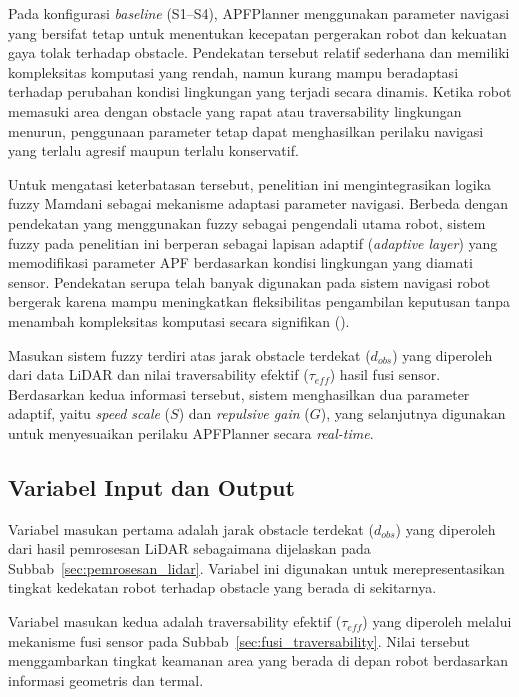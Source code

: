 Pada konfigurasi \textit{baseline} (S1--S4), APFPlanner menggunakan parameter navigasi yang bersifat tetap untuk menentukan kecepatan pergerakan robot dan kekuatan gaya tolak terhadap obstacle. Pendekatan tersebut relatif sederhana dan memiliki kompleksitas komputasi yang rendah, namun kurang mampu beradaptasi terhadap perubahan kondisi lingkungan yang terjadi secara dinamis. Ketika robot memasuki area dengan obstacle yang rapat atau traversability lingkungan menurun, penggunaan parameter tetap dapat menghasilkan perilaku navigasi yang terlalu agresif maupun terlalu konservatif.

Untuk mengatasi keterbatasan tersebut, penelitian ini mengintegrasikan logika fuzzy Mamdani sebagai mekanisme adaptasi parameter navigasi. Berbeda dengan pendekatan yang menggunakan fuzzy sebagai pengendali utama robot, sistem fuzzy pada penelitian ini berperan sebagai lapisan adaptif (\textit{adaptive layer}) yang memodifikasi parameter APF berdasarkan kondisi lingkungan yang diamati sensor. Pendekatan serupa telah banyak digunakan pada sistem navigasi robot bergerak karena mampu meningkatkan fleksibilitas pengambilan keputusan tanpa menambah kompleksitas komputasi secara signifikan (\cite{Haider2022,Benaicha2026}).

Masukan sistem fuzzy terdiri atas jarak obstacle terdekat ($d_{obs}$) yang diperoleh dari data LiDAR dan nilai traversability efektif ($\tau_{eff}$) hasil fusi sensor. Berdasarkan kedua informasi tersebut, sistem menghasilkan dua parameter adaptif, yaitu \textit{speed scale} ($S$) dan \textit{repulsive gain} ($G$), yang selanjutnya digunakan untuk menyesuaikan perilaku APFPlanner secara \textit{real-time}.

\subsection{Variabel Input dan Output}

Variabel masukan pertama adalah jarak obstacle terdekat ($d_{obs}$) yang diperoleh dari hasil pemrosesan LiDAR sebagaimana dijelaskan pada Subbab~\ref{sec:pemrosesan_lidar}. Variabel ini digunakan untuk merepresentasikan tingkat kedekatan robot terhadap obstacle yang berada di sekitarnya.

Variabel masukan kedua adalah traversability efektif ($\tau_{eff}$) yang diperoleh melalui meka\-nisme fusi sensor pada Subbab~\ref{sec:fusi_traversability}. Nilai tersebut menggambarkan tingkat keamanan area yang berada di depan robot berdasarkan informasi geometris dan termal.

